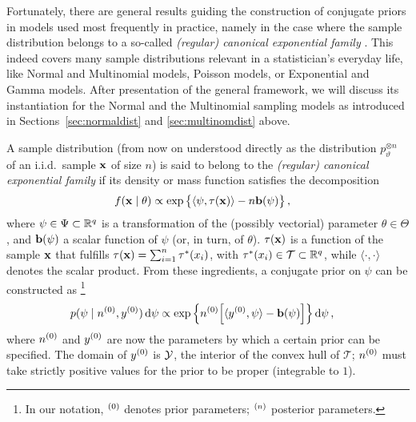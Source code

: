 Fortunately, there are general results guiding the construction of conjugate priors in models used most frequently in practice,
namely in the case where the sample distribution belongs to a so-called \emph{(regular) canonical exponential family}
\cite[pp.~202 and 272f]{2000:bernardosmith}. %
This indeed covers many sample distributions relevant in a statistician's everyday life,
like Normal and Multinomial models, Poisson models, or Exponential and Gamma models.
After presentation of the general framework, we will discuss its instantiation for the Normal
and the Multinomial sampling models as introduced in Sections~\ref{sec:normaldist} and \ref{sec:multinomdist} above.

A sample distribution
(from now on understood directly as the distribution $p_\vartheta^{\otimes n}$ of an i.i.d.\ sample $\mathbf{x}$ of size $n$)
is said to belong to the \emph{(regular) canonical exponential family} if its density or mass function satisfies the decomposition
\begin{align}
\label{eq:expofam-sampledens}
f(\mathbf{x} \mid \theta) &\propto \exp\big\{\langle \psi, \tau(\mathbf{x}) \rangle - n \mathbf{b}(\psi)\big\}\,,
\end{align}
where $\psi \in \Psi \subset \mathbb{R}^q$ is a transformation of the (possibly vectorial) parameter $\theta \in \Theta$,
and $\mathbf{b}(\psi)$ a scalar function of $\psi$ (or, in turn, of $\theta$).
$\tau(\mathbf{x})$ is a function of the sample $\mathbf{x}$ that fulfills $\tau(\mathbf{x}) = \sum_{i=1}^n \tau^*(x_i)$,
with $\tau^*(x_i) \in \mathcal{T} \subset \mathbb{R}^q$,
while $\langle\cdot, \cdot\rangle$ denotes the scalar product.
From these ingredients, a conjugate prior on $\psi$ can be constructed as%
\footnote{In our notation, ${}^{(0)}$ denotes prior parameters; ${}^{(n)}$ posterior parameters.}
\begin{align}
\label{eq:canonicalprior}
p(\psi \mid n^{(0)}, y^{(0)}) \,\mathrm{d}\psi
 &\propto \exp\Big\{ n^{(0)} \Big[ \langle y^{(0)}, \psi \rangle - \mathbf{b}(\psi) \Big] \Big\} \,\mathrm{d}\psi\,,
\end{align}
where $n^{(0)}$ and $y^{(0)}$ are now the parameters by which a certain prior can be specified.
The domain of $y^{(0)}$ is $\mathcal{Y}$, the interior of the convex hull of $\mathcal{T}$;
$n^{(0)}$ must take strictly positive values for the prior to be proper (integrable to $1$).

